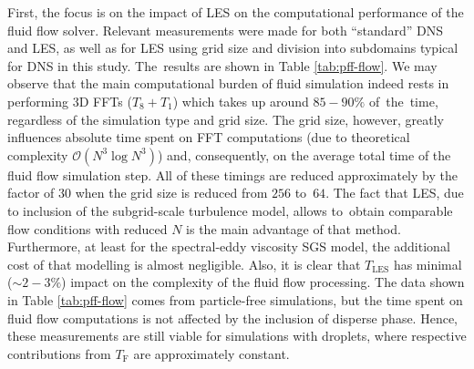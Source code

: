 \documentclass{pracamgren}
\begin{document}
\medskip

First, the focus is on the impact of LES on the computational performance of the fluid flow solver.
Relevant measurements were made for both ``standard'' DNS and LES, as well as for LES using grid size and division into subdomains typical for DNS in this study.
The~results are shown in Table \ref{tab:pff-flow}.
We may observe that the main computational burden of fluid simulation indeed rests in performing 3D FFTs ($T_8 + T_1$) which takes up around $85-90 \%$ of~the~time, regardless of the simulation type and grid size.
The grid size, however, greatly influences absolute time spent on FFT computations (due to theoretical complexity $\mathcal{O}(N^3 \log N^3)$) and, consequently, on the average total time of the fluid flow simulation step.
All of these timings are reduced approximately by the factor of $30$ when the grid size is reduced from $256$ to~$64$.
The fact that LES, due to inclusion of the subgrid-scale turbulence model, allows to~obtain comparable flow conditions with reduced $N$ is the main advantage of that method.
Furthermore, at least for the spectral-eddy viscosity SGS model, the additional cost of that modelling is almost negligible.
Also, it is clear that $T_{\text{LES}}$ has minimal ($\sim 2-3 \%$) impact on the complexity of the fluid flow processing.
The data shown in Table \ref{tab:pff-flow} comes from particle-free simulations, but the time spent on fluid flow computations is not affected by the inclusion of disperse phase.
Hence, these measurements are still viable for simulations with droplets, where respective contributions from $T_{\text{F}}$ are approximately constant. 
\end{document}
